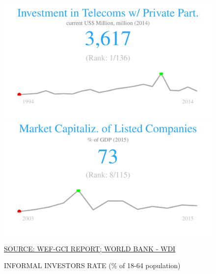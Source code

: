\documentclass{article}\usepackage[]{graphicx}\usepackage[]{color}
\makeatletter
\def\maxwidth{ %
  \ifdim\Gin@nat@width>\linewidth
    \linewidth
  \else
    \Gin@nat@width
  \fi
}
\makeatother
\begin{document}
\begin{figure}
\begin{minipage}[c]{0.95\textwidth}
\begin{minipage}[c]{0.95\textwidth}
\begin{minipage}[c]{0.32\textwidth}
{}



      \end{minipage}
      \begin{minipage}[c]{0.32\textwidth}


{\centering \includegraphics[width=\maxwidth]{figure/figure_sparkline_Fin2-1} 

}



      \end{minipage}
      \begin{minipage}[c]{0.32\textwidth}


{\centering \includegraphics[width=\maxwidth]{figure/figure_sparkline_Fin3-1} 

}



      \end{minipage}
       \hspace{4ex}\scriptsize{\href{NA}{\textcolor[HTML]{22A6F5}{SOURCE: WEF-GCI REPORT; WORLD BANK - WDI}}}
  \end{minipage}
    
  \begin{minipage}[c]{0.95\textwidth} %
    \vspace*{0.6cm}
    \begin{minipage}[c]{0.49\textwidth} %
      \small{\textcolor[HTML]{818181}{INFORMAL INVESTORS RATE (\% of 18-64 population)}}



\end{minipage}
\end{minipage}
\end{minipage}
\end{figure}
\end{document}

